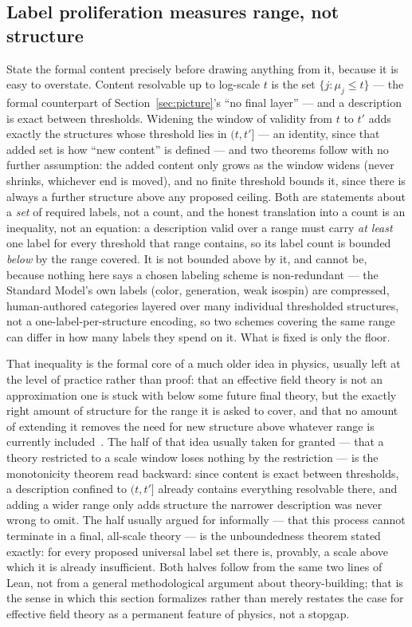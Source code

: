 \documentclass[pdflatex,sn-mathphys-num]{sn-jnl}
\theoremstyle{thmstyleone}
\theoremstyle{thmstylethree}
\theoremstyle{thmstyletwo}
\begin{document}
\subsection{Label proliferation measures range, not structure}\label{ss:labelrange}

State the formal content precisely before drawing anything from it,
because it is easy to overstate. Content resolvable up to log-scale $t$
is the set $\{j : \mu_j \le t\}$ — the formal counterpart of
Section~\ref{sec:picture}'s ``no final layer'' — and a description is
exact between thresholds. Widening the window of validity
from $t$ to $t'$ adds exactly the structures whose threshold lies in
$(t,t']$ — an identity, since that added set is how ``new content'' is
defined — and two theorems follow with no further assumption: the added
content only grows as the window widens (never shrinks, whichever end is
moved), and no finite threshold bounds it, since there is always a
further structure above any proposed ceiling. Both are statements about
a \emph{set} of required labels, not a count, and the honest translation
into a count is an inequality, not an equation: a description valid over
a range must carry \emph{at least} one label for every threshold that
range contains, so its label count is bounded \emph{below} by the range
covered. It is not bounded above by it, and cannot be, because nothing
here says a chosen labeling scheme is non-redundant — the Standard
Model's own labels (color, generation, weak isospin) are compressed,
human-authored categories layered over many individual thresholded
structures, not a one-label-per-structure encoding, so two schemes
covering the same range can differ in how many labels they spend on it.
What is fixed is only the floor.

That inequality is the formal core of a much older idea in physics,
usually left at the level of practice rather than proof: that an
effective field theory is not an approximation one is stuck with below
some future final theory, but the exactly right amount of structure for
the range it is asked to cover, and that no amount of extending it
removes the need for new structure above whatever range is currently
included~\cite{Batterman2002}. The half of that idea usually taken for
granted — that a theory restricted to a scale window loses nothing by
the restriction — is the monotonicity theorem read backward: since
content is exact between thresholds, a description confined to
$(t,t']$ already contains everything resolvable there, and adding a
wider range only adds structure the narrower description was never
wrong to omit. The half usually argued for informally — that this process
cannot terminate in a final, all-scale theory — is the unboundedness
theorem stated exactly: for every proposed universal label set there is,
provably, a scale above which it is already insufficient. Both halves
follow from the same two lines of Lean, not from a general methodological
argument about theory-building; that is the sense in which this section
formalizes rather than merely restates the case for effective field
theory as a permanent feature of physics, not a stopgap.
\end{document}
